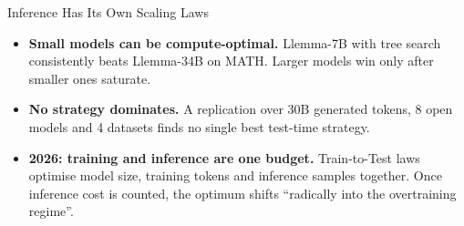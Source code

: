 \begin{frame}{Inference Has Its Own Scaling Laws}
    \begin{itemize}\itemsep0.55em
        \item \textbf{Small models can be compute-optimal.} Llemma-7B with tree search consistently beats Llemma-34B on MATH. Larger models win only after smaller ones saturate.
        \item \textbf{No strategy dominates.} A replication over 30B generated tokens, 8 open models and 4 datasets finds no single best test-time strategy.
        \item \textbf{2026: training and inference are one budget.} Train-to-Test laws optimise model size, training tokens and inference samples together. Once inference cost is counted, the optimum shifts ``radically into the overtraining regime''.
    \end{itemize}
    \vspace{0.2em}
\end{frame}


